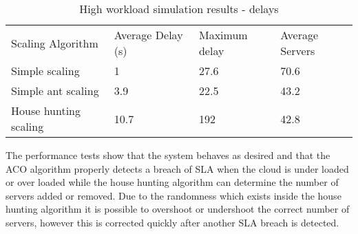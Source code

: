 \documentclass[conference]{IEEEtran}
\begin{document}
\begin{table}
\caption{High workload simulation results - delays}
\label{table:sim3-delay}
\begin{tabu} to\linewidth{|X[c]|X[c]|X[c]|X[c]|}
\everyrow{\hline}
\hline
Scaling Algorithm & Average Delay (s) & Maximum delay & Average Servers  \\
Simple scaling & 1 & 27.6 & 70.6 \\
Simple ant scaling & 3.9 & 22.5 & 43.2 \\
House hunting scaling & 10.7 & 192 & 42.8 \\
\end{tabu}
\end{table}

The performance tests show that the system behaves as desired and that the ACO algorithm properly detects a breach of SLA when the cloud is under loaded or over loaded while the house hunting algorithm can determine the number of servers added or removed. Due to the randomness which exists inside the house hunting algorithm it is possible to overshoot or undershoot the correct number of servers, however this is corrected quickly after another SLA breach is detected.

%
%

\end{document}
